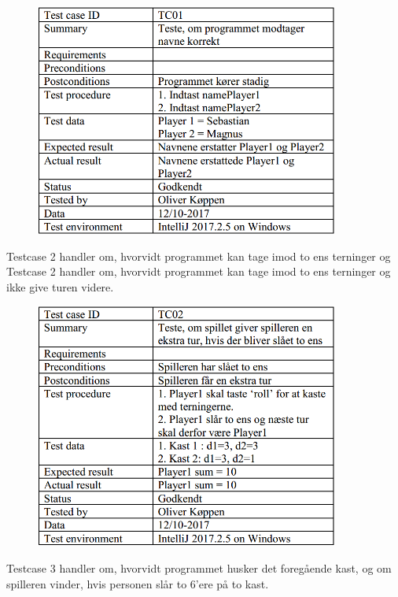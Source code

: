 \begin{figure}[h]
    \begin{center}
        \includegraphics[width=10cm]{graphics/TC01}
    \end{center}
\end{figure}

Testcase 2 handler om, hvorvidt programmet kan tage imod to ens terninger og Testcase 2 handler om, hvorvidt programmet kan tage imod to ens terninger og ikke give turen videre.
\begin{figure}[h]
    \begin{center}
        \includegraphics[width=10cm]{graphics/TC02}
    \end{center}
\end{figure}

Testcase 3 handler om, hvorvidt programmet husker det foregående kast, og om spilleren vinder, hvis personen slår to 6'ere på to kast.

